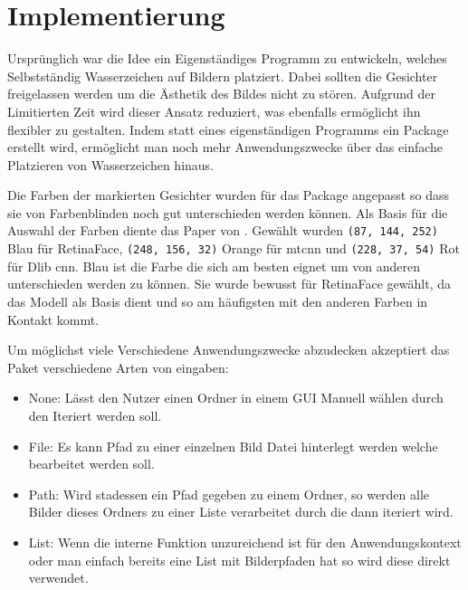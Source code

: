 \chapter{Implementierung}

Ursprünglich war die Idee ein Eigenständiges Programm zu entwickeln, welches Selbstständig Wasserzeichen auf Bildern platziert. Dabei sollten die Gesichter freigelassen werden um die Ästhetik des Bildes nicht zu stören. Aufgrund der Limitierten Zeit wird dieser Ansatz reduziert, was ebenfalls ermöglicht ihn flexibler zu gestalten. Indem statt eines eigenständigen Programms ein Package erstellt wird, ermöglicht man noch mehr Anwendungszwecke über das einfache Platzieren von Wasserzeichen hinaus.

Die Farben der markierten Gesichter wurden für das Package angepasst so dass sie von Farbenblinden noch gut unterschieden werden können. Als Basis für die Auswahl der Farben diente das Paper von \cite{abs-2107-02270}. Gewählt wurden \texttt{(87, 144, 252)} Blau für RetinaFace, \texttt{(248, 156, 32)} Orange für \gls{mtcnn} und \texttt{(228, 37, 54)} Rot für Dlib \gls{cnn}. Blau ist die Farbe die sich am besten eignet um von anderen unterschieden werden zu können. Sie wurde bewusst für RetinaFace gewählt, da das Modell als Basis dient und so am häufigsten mit den anderen Farben in Kontakt kommt.

Um möglichst viele Verschiedene Anwendungszwecke abzudecken akzeptiert das Paket verschiedene Arten von eingaben:
\begin{itemize}
  \item None: Lässt den Nutzer einen Ordner in einem GUI Manuell wählen durch den Iteriert werden soll.
  \item File: Es kann Pfad zu einer einzelnen Bild Datei hinterlegt werden welche bearbeitet werden soll.
  \item Path: Wird stadessen ein Pfad gegeben zu einem Ordner, so werden alle Bilder dieses Ordners zu einer Liste verarbeitet durch die dann iteriert wird.
  \item List: Wenn die interne Funktion unzureichend ist für den Anwendungskontext oder man einfach bereits eine List mit Bilderpfaden hat so wird diese direkt verwendet.
\end{itemize}
